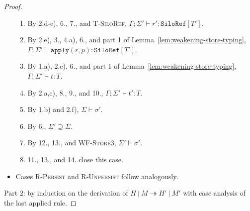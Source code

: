 \begin{proof}
\begin{itemize}
\begin{enumerate}
\item By 2.d-e), 6., 7., and \textsc{T-SiloRef}, $\Gamma ; \Sigma' \vdash r' : \texttt{SiloRef}[T']$.
\item By 2.e), 3., 4.a), 6., and part 1 of Lemma~\ref{lem:weakening-store-typing}, $\Gamma ; \Sigma' \vdash \texttt{apply}(r, p) : \texttt{SiloRef}[T']$.
\item By 1.a), 2.e), 6., and part 1 of Lemma~\ref{lem:weakening-store-typing}, $\Gamma ; \Sigma' \vdash t : T$.
\item By 2.a,c), 8., 9., and 10., $\Gamma ; \Sigma' \vdash t' : T$.
\item By 1.b) and 2.f), $\Sigma \vdash \sigma'$.
\item By 6., $\Sigma' \supseteq \Sigma$.
\item By 12., 13., and \textsc{WF-Store3}, $\Sigma' \vdash \sigma'$.
\item 11., 13., and 14. close this case.

\end{enumerate}

\item Cases \textsc{R-Persist} and \textsc{R-Unpersist} follow analogously.
\end{itemize}

%
Part 2: by induction on the derivation of $H~|~M \twoheadrightarrow H'~|~M'$ with case analysis of the last applied rule.


\end{proof}
